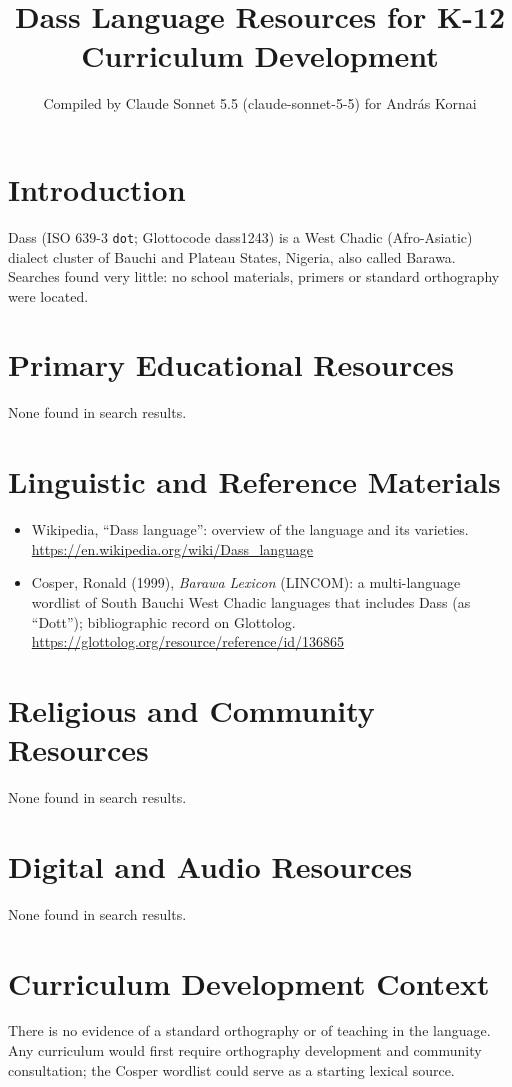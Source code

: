 \documentclass[12pt]{article}
\title{Dass Language Resources for K-12 Curriculum Development}
\author{Compiled by Claude Sonnet 5.5 (claude-sonnet-5-5) for Andr\'as Kornai}
\date{}
\begin{document}
\maketitle
\section{Introduction}
Dass (ISO 639-3 \texttt{dot}; Glottocode dass1243) is a West Chadic (Afro-Asiatic) dialect cluster of Bauchi and Plateau States, Nigeria, also called Barawa. Searches found very little: no school materials, primers or standard orthography were located.
\section{Primary Educational Resources}
None found in search results.
\section{Linguistic and Reference Materials}
\begin{itemize}
\item Wikipedia, ``Dass language'': overview of the language and its varieties. \url{https://en.wikipedia.org/wiki/Dass_language}
\item Cosper, Ronald (1999), \emph{Barawa Lexicon} (LINCOM): a multi-language wordlist of South Bauchi West Chadic languages that includes Dass (as ``Dott''); bibliographic record on Glottolog. \url{https://glottolog.org/resource/reference/id/136865}
\end{itemize}
\section{Religious and Community Resources}
None found in search results.
\section{Digital and Audio Resources}
None found in search results.
\section{Curriculum Development Context}
There is no evidence of a standard orthography or of teaching in the language. Any curriculum would first require orthography development and community consultation; the Cosper wordlist could serve as a starting lexical source.
\end{document}
